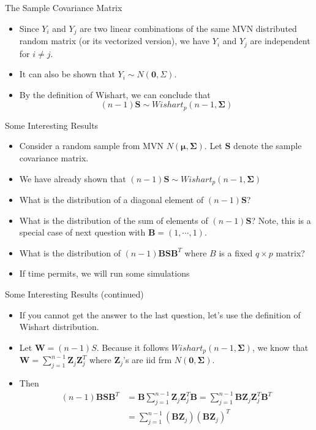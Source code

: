\documentclass[
  ignorenonframetext,
]{beamer}
\begin{document}
\begin{frame}{The Sample Covariance Matrix}
\protect\hypertarget{the-sample-covariance-matrix-3}{}
\begin{itemize}
\item
  Since \(Y_i\) and \(Y_j\) are two linear combinations of the same MVN
  distributed random matrix (or its vectorized version), we have \(Y_i\)
  and \(Y_j\) are independent for \(i\not=j\).
\item
  It can also be shown that \(Y_i \sim N(\mathbf 0, \Sigma)\).
\item
  By the definition of Wishart, we can conclude that
  \[(n-1)\mathbf S\sim Wishart_p(n-1, \boldsymbol \Sigma)\]
\end{itemize}
\end{frame}

\begin{frame}{Some Interesting Results}
\protect\hypertarget{some-interesting-results}{}
\begin{itemize}
\item
  Consider a random sample from MVN
  \(N(\boldsymbol \mu, \boldsymbol \Sigma)\). Let \(\mathbf S\) denote
  the sample covariance matrix.
\item
  We have already shown that
  \((n-1)\mathbf S \sim Wishart_p(n-1, \boldsymbol \Sigma)\)
\item
  What is the distribution of a diagonal element of \((n-1)\mathbf S\)?
\item
  What is the distribution of the sum of elements of \((n-1)\mathbf S\)?
  Note, this is a special case of next question with
  \(\mathbf B=(1, \cdots, 1)\).
\item
  What is the distribution of \((n-1)\mathbf B \mathbf S \mathbf B^T\)
  where \(B\) is a fixed \(q\times p\) matrix?
\item
  If time permits, we will run some simulations
\end{itemize}
\end{frame}

\begin{frame}{Some Interesting Results (continued)}
\protect\hypertarget{some-interesting-results-continued}{}
\begin{itemize}
\item
  If you cannot get the answer to the last question, let's use the
  definition of Wishart distribution.
\item
  Let \(\mathbf W = (n-1)S\). Because it follows
  \(Wishart_p(n-1, \boldsymbol\Sigma)\), we know that
  \(\mathbf W=\sum_{j=1}^{n-1} \mathbf Z_j \mathbf Z_j^T\) where
  \(\mathbf Z_j\)'s are iid frm \(N(\mathbf 0, \boldsymbol\Sigma)\).
\item
  Then \[
  \begin{aligned}
  (n-1)\mathbf B \mathbf S \mathbf B^T &= \mathbf B\sum_{j=1}^{n-1} \mathbf Z_j \mathbf Z_j^T\mathbf B = \sum_{j=1}^{n-1} \mathbf B \mathbf Z_j \mathbf Z_j^T\mathbf B^T\\
  &= \sum_{j=1}^{n-1} (\mathbf B \mathbf Z_j)(\mathbf B \mathbf Z_j)^T
  \end{aligned}
  \]
\end{itemize}
\end{frame}
\end{document}
